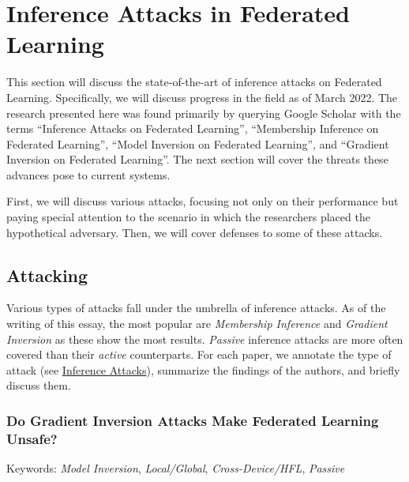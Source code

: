 \documentclass[
  compsoc]{IEEEtran}
\begin{document}
\hypertarget{inference-attacks-in-federated-learning}{%
\section{Inference Attacks in Federated
Learning}\label{inference-attacks-in-federated-learning}}

This section will discuss the state-of-the-art of inference attacks on
Federated Learning. Specifically, we will discuss progress in the field
as of March 2022. The research presented here was found primarily by
querying Google Scholar with the terms ``Inference Attacks on Federated
Learning'', ``Membership Inference on Federated Learning'', ``Model
Inversion on Federated Learning'', and ``Gradient Inversion on Federated
Learning''. The next section will cover the threats these advances pose
to current systems.

First, we will discuss various attacks, focusing not only on their
performance but paying special attention to the scenario in which the
researchers placed the hypothetical adversary. Then, we will cover
defenses to some of these attacks.

\hypertarget{attacking}{%
\subsection{Attacking}\label{attacking}}

Various types of attacks fall under the umbrella of inference attacks.
As of the writing of this essay, the most popular are \emph{Membership
Inference} and \emph{Gradient Inversion} as these show the most results.
\emph{Passive} inference attacks are more often covered than their
\emph{active} counterparts. For each paper, we annotate the type of
attack (see \protect\hyperlink{inference-attacks}{Inference Attacks}),
summarize the findings of the authors, and briefly discuss them.

\hypertarget{do-gradient-inversion-attacks-make-federated-learning-unsafe}{%
\subsubsection{Do Gradient Inversion Attacks Make Federated Learning
Unsafe?}\label{do-gradient-inversion-attacks-make-federated-learning-unsafe}}

Keywords: \emph{Model Inversion}, \emph{Local/Global},
\emph{Cross-Device/HFL}, \emph{Passive}
\end{document}
